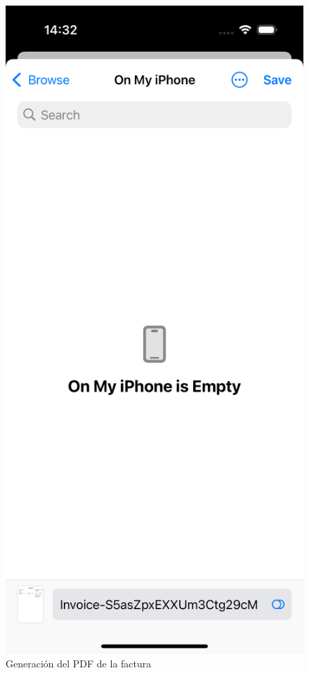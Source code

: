 \begin{large}
\begin{figure}[H]
	\centering
  \begin{minipage}[t]{0.45\textwidth}
    \centering
    \includegraphics[width=\linewidth]{Ilustraciones/ios_save_pdf.png}
    \caption{Generación del PDF de la factura}
    \label{fig:save_pdf}
  \end{minipage}
\end{figure}

\end{large}

